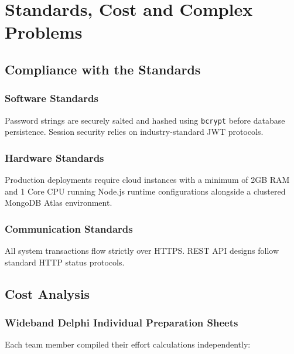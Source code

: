\documentclass[a4paper,11pt]{report}
\begin{document}
\chapter{Standards, Cost and Complex Problems}

\section{Compliance with the Standards}
\subsection{Software Standards}
Password strings are securely salted and hashed using \texttt{bcrypt} before database persistence. Session security relies on industry-standard JWT protocols.

\subsection{Hardware Standards}
Production deployments require cloud instances with a minimum of 2GB RAM and 1 Core CPU running Node.js runtime configurations alongside a clustered MongoDB Atlas environment.

\subsection{Communication Standards}
All system transactions flow strictly over HTTPS. REST API designs follow standard HTTP status protocols.

\section{Cost Analysis}

\subsection{Wideband Delphi Individual Preparation Sheets}
Each team member compiled their effort calculations independently:
\end{document}
